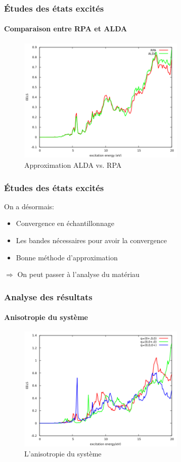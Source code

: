 \documentclass[french]{beamer}
\begin{document}
\begin{frame}
\frametitle{Études des états excités}
\framesubtitle{Comparaison entre RPA et ALDA}
\begin{figure}[!h]
    \centering
    \includegraphics[width=8cm]{alda_vs_rpa}
    \caption{Approximation ALDA vs. RPA}\label{fig-alda_vs_rpa}
\end{figure}

\end{frame}
\begin{frame}
\frametitle{Études des états excités}
On a désormais:
\begin{itemize}
\item Convergence en échantillonnage
\item Les bandes nécessaires pour avoir la convergence
\item Bonne méthode d'approximation
\end{itemize}
$\Longrightarrow$ On peut passer à l'analyse du matériau
\end{frame}


\begin{frame}
\frametitle{Analyse des résultats}
\framesubtitle{Anisotropie du système}
\begin{figure}[!h]
    \centering
    \includegraphics[width=8cm]{anisotropy}
    \caption{L'anisotropie du système}\label{fig-anisotropie}
\end{figure}

\end{frame}
\end{document}

